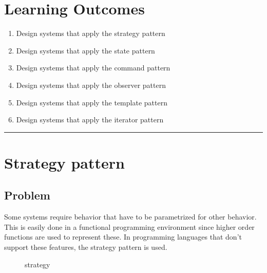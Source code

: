 \section{Learning
Outcomes}\label{behavioral-patterns.md__learning-outcomes}

\begin{enumerate}
\def\labelenumi{\arabic{enumi}.}
\tightlist
\item
  Design systems that apply the strategy pattern
\item
  Design systems that apply the state pattern
\item
  Design systems that apply the command pattern
\item
  Design systems that apply the observer pattern
\item
  Design systems that apply the template pattern
\item
  Design systems that apply the iterator pattern
\end{enumerate}

\begin{center}\rule{0.5\linewidth}{0.5pt}\end{center}

\section{Strategy
pattern}\label{behavioral-patterns.md__strategy-pattern}

\subsection{Problem}\label{behavioral-patterns.md__problem}

Some systems require behavior that have to be parametrized for other
behavior. This is easily done in a functional programming environment
since higher order functions are used to represent these. In programming
languages that don't support these features, the strategy pattern is
used.

\begin{figure}
\centering
{}
\caption{strategy}
\end{figure}


